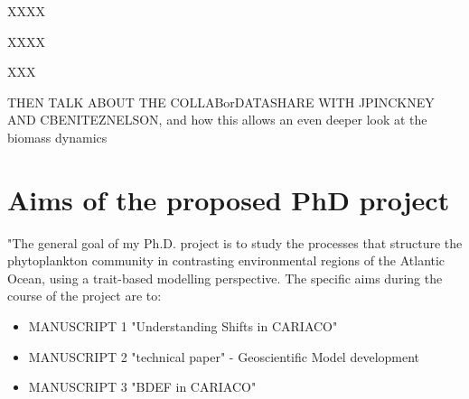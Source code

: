  

XXXX

XXXX

XXX

THEN TALK ABOUT THE COLLABorDATASHARE WITH JPINCKNEY AND CBENITEZNELSON, and how this allows an even deeper look at the biomass dynamics


\section{Aims of the proposed PhD project}
"The general goal of my Ph.D. project is to study the processes that structure the phytoplankton community in contrasting environmental regions of the Atlantic Ocean, using a trait-based modelling perspective. The specific aims during the course of the project are to:

\begin{itemize}
\item MANUSCRIPT 1 "Understanding Shifts in CARIACO"
\item MANUSCRIPT 2 "technical paper" - Geoscientific Model development
\item MANUSCRIPT 3 "BDEF in CARIACO"
\end{itemize}
